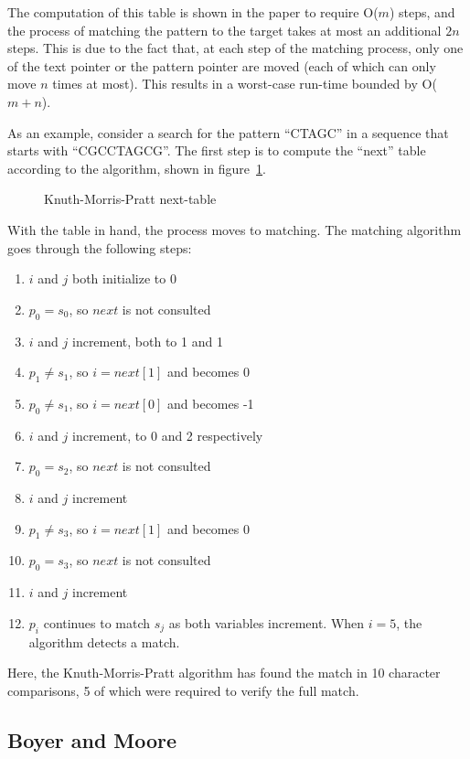 The computation of this table is shown in the paper to require O($m$) steps, and the process of matching the pattern to the target takes at most an additional $2n$ steps. This is due to the fact that, at each step of the matching process, only one of the text pointer or the pattern pointer are moved (each of which can only move $n$ times at most). This results in a worst-case run-time bounded by O($m+n$).

As an example, consider a search for the pattern ``CTAGC'' in a sequence that starts with ``CGCCTAGCG''. The first step is to compute the ``next'' table according to the algorithm, shown in figure~\ref{fig:kmp_next}.

\begin{figure}[ht]
\centering

\caption{Knuth-Morris-Pratt next-table}
\label{fig:kmp_next}
\end{figure}
\onehalfspacing

With the table in hand, the process moves to matching. The matching algorithm goes through the following steps:

\singlespacing
\begin{enumerate}
\item $i$ and $j$ both initialize to 0
\item $p_0 = s_0$, so $next$ is not consulted
\item $i$ and $j$ increment, both to 1 and 1
\item $p_1 \neq s_1$, so $i = next[1]$ and becomes 0
\item $p_0 \neq s_1$, so $i = next[0]$ and becomes -1
\item $i$ and $j$ increment, to 0 and 2 respectively
\item $p_0 = s_2$, so $next$ is not consulted
\item $i$ and $j$ increment
\item $p_1 \neq s_3$, so $i = next[1]$ and becomes 0
\item $p_0 = s_3$, so $next$ is not consulted
\item $i$ and $j$ increment
\item $p_i$ continues to match $s_j$ as both variables increment. When $i = 5$, the algorithm detects a match.
\end{enumerate}
\onehalfspacing

Here, the Knuth-Morris-Pratt algorithm has found the match in 10 character comparisons, 5 of which were required to verify the full match.

\subsection{Boyer and Moore}

